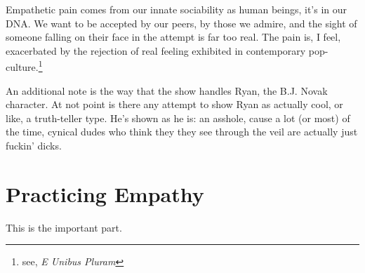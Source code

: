 \documentclass[../philo.tex]{subfiles}
\begin{document}
Empathetic pain comes from our innate sociability as human beings, it's in our DNA.
We want to be accepted by our peers, by those we admire, and the sight of someone falling on their face in the attempt is far too real.
The pain is, I feel, exacerbated by the rejection of real feeling exhibited in contemporary pop-culture.\footnote{see, \textit{E Unibus Pluram}}

An additional note is the way that the show handles Ryan, the B.J. Novak character.
At not point is there any attempt to show Ryan as actually cool, or like, a truth-teller type.
He's shown as he is: an asshole, cause a lot (or most) of the time, cynical dudes who think they they see through the veil are actually just fuckin' dicks.

\section{Practicing Empathy}
This is the important part.
\end{document}
